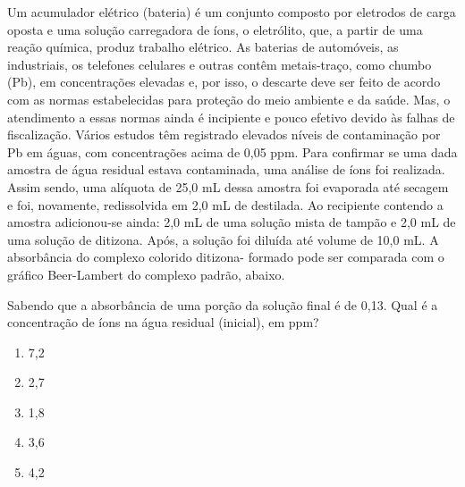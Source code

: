 Um acumulador elétrico (bateria) é um conjunto composto por eletrodos de carga oposta e uma solução carregadora de íons, o eletrólito, que, a partir de uma reação química, produz trabalho elétrico.
As baterias de automóveis, as industriais, os telefones celulares e outras contêm metais-traço, como chumbo (Pb), em concentrações elevadas e, por isso, o descarte deve ser feito de acordo com as normas estabelecidas para proteção do meio ambiente e da saúde.
Mas, o atendimento a essas normas ainda é incipiente e pouco efetivo devido às falhas de fiscalização.
Vários estudos têm registrado elevados níveis de contaminação por Pb em águas, com concentrações acima de 0,05 ppm.
Para confirmar se uma dada amostra de água residual estava contaminada, uma análise de íons  foi realizada. Assim sendo, uma alíquota de 25,0 mL
dessa amostra foi evaporada até secagem e foi, novamente, redissolvida em 2,0 mL de  destilada.
Ao recipiente contendo a amostra adicionou-se ainda: 2,0 mL de uma solução mista de tampão e 2,0 mL de uma solução de ditizona.
Após, a solução foi diluída até volume de 10,0 mL.
A absorbância do complexo colorido ditizona- formado pode ser comparada com o gráfico Beer-Lambert do complexo padrão, abaixo.


Sabendo que a absorbância de uma porção da solução final é de 0,13.
Qual é a concentração de íons  na água residual (inicial), em ppm?

\begin{enumerate}[label = (\alph*)]
	\item 7,2
	\item 2,7
	\item 1,8
	\item 3,6
	\item 4,2
\end{enumerate}

